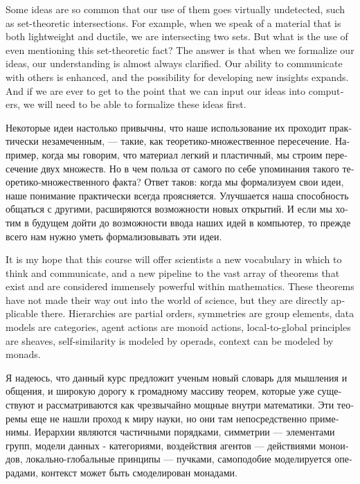 \documentclass[a4paper]{book}
\theoremstyle{myth}
\begin{document}
\begin{english}
Some ideas are so common that our use of them goes virtually undetected, such as set-theoretic intersections. For example, when we speak of a material that is both lightweight and ductile, we are intersecting two sets. But what is the use of even mentioning this set-theoretic fact? The answer is that when we formalize our ideas, our understanding is almost always clarified. Our ability to communicate with others is enhanced, and the possibility for developing new insights expands. And if we are ever to get to the point that we can input our ideas into computers, we will need to be able to formalize these ideas first.

\begin{russian}Некоторые идеи настолько привычны, что наше использование их проходит практически незамеченным, — такие, как теоретико-множественное пересечение. Например, когда мы говорим, что материал легкий и пластичный, мы строим пересечение двух множеств. Но в чем польза от самого по себе упоминания такого теоретико-множественного факта? Ответ таков: когда мы формализуем свои идеи, наше понимание практически всегда проясняется. Улучшается наша способность общаться с другими, расширяются возможности новых открытий. И если мы хотим в будущем дойти до возможности ввода наших идей в компьютер, то прежде всего нам нужно уметь формализовывать эти идеи. \end{russian}

It is my hope that this course will offer scientists a new vocabulary in which to think and communicate, and a new pipeline to the vast array of theorems that exist and are considered immensely powerful within mathematics. These theorems have not made their way out into the world of science, but they are directly applicable there. Hierarchies are partial orders, symmetries are group elements, data models are categories, agent actions are monoid actions, local-to-global principles are sheaves, self-similarity is modeled by operads, context can be modeled by monads.

\begin{russian}Я надеюсь, что данный курс предложит ученым новый словарь для мышления и общения, и широкую дорогу к громадному массиву теорем, которые уже существуют и рассматриваются как чрезвычайно мощные внутри математики. Эти теоремы еще не нашли проход к миру науки, но они там непосредственно применимы. Иерархии являются частичными порядками, симметрии — элементами групп, модели данных - категориями, воздействия агентов — действиями моноидов, локально-глобальные принципы — пучками, самоподобие моделируется операдами, контекст может быть смоделирован монадами. \end{russian}


\end{english}
\end{document}
